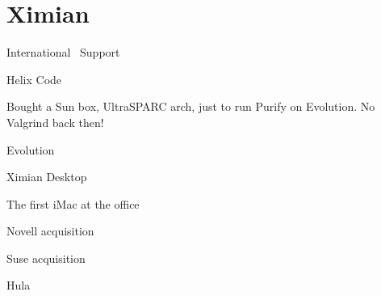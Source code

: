 \chapter{Ximian}

International \GNOME\ Support

Helix Code

Bought a Sun box, UltraSPARC arch, just to run Purify on Evolution.
No Valgrind back then!

Evolution

Ximian Desktop

The first iMac at the office

Novell acquisition

Suse acquisition

Hula
